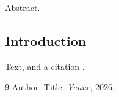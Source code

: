 \documentclass{gecko-paper}
\begin{document}
\makepapertitle
\begin{paperabstract}
Abstract.
\end{paperabstract}

\begin{paperbody}
\section{Introduction}
Text, and a citation .


\renewcommand{\refname}{References}
\begin{thebibliography}{9}
\paperbibstyle
{} Author. Title. \textit{Venue}, 2026.
\end{thebibliography}
\end{paperbody}
\end{document}
